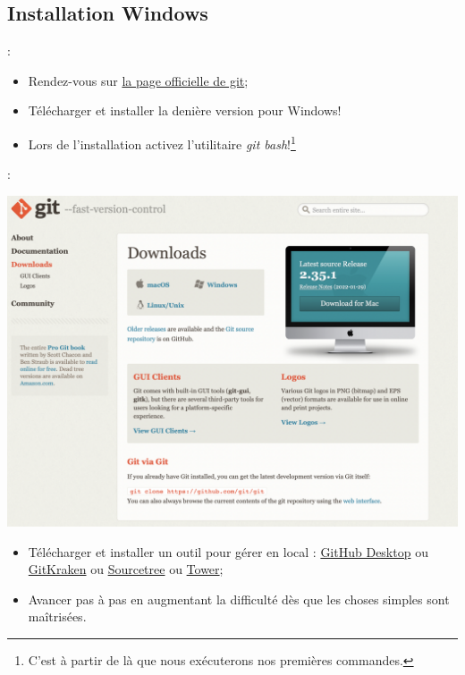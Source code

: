 \documentclass[10pt]{beamer}
\begin{document}
\subsection{Installation Windows}
\begin{frame}{\secname : \subsecname}
    \begin{itemize}
        \item Rendez-vous sur \href{https://git-scm.com/downloads}{la page officielle de git};
        \item Télécharger et installer la denière version pour Windows!
        \item Lors de l'installation activez l'utilitaire \emph{git bash}!\footnote{C'est à partir de là que nous exécuterons nos premières commandes.}
    \end{itemize}
\end{frame}
\begin{frame}{\secname : \subsecname}
    \centerline{\includegraphics[height=0.8\textheight]{img/git.jpg}}
\end{frame}
\begin{frame}{\secname}
    \begin{itemize}
        \item Télécharger et installer un outil pour gérer en local :
              \href{https://desktop.github.com}{GitHub Desktop} ou \href{https://www.gitkraken.com}{GitKraken} ou \href{https://www.sourcetreeapp.com}{Sourcetree} ou \href{https://www.git-tower.com/mac}{Tower};
        \item Avancer pas à pas en augmentant la difficulté dès que les choses simples sont maîtrisées.
    \end{itemize}
\end{frame}
\end{document}
